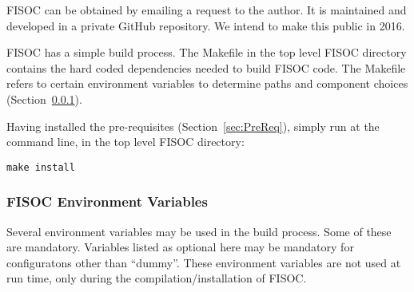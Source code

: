 \documentclass[12pt]{article}
\begin{document}
FISOC can be obtained by emailing a request to the author.  It is maintained and developed in a 
private GitHub repository.  We intend to make this public in 2016.

FISOC has a simple build process.  The Makefile in the top level FISOC directory contains the 
hard coded dependencies needed to build FISOC code.  The Makefile refers to certain 
environment variables to determine paths and component choices (Section~\ref{sec:EnvVars}). 

Having installed the pre-requisites (Section~\ref{sec:PreReq}), simply run at the command line, 
in the top level FISOC directory:
\begin{lstlisting}
make install
\end{lstlisting}


\subsubsection{FISOC Environment Variables}
\label{sec:EnvVars}

Several environment variables may be used in the build process. 
Some of these are mandatory. 
Variables listed as optional here may be mandatory for configuratons other than 
``dummy''.
These environment variables are not used at run time, only during 
the compilation/installation of FISOC.
\end{document}
